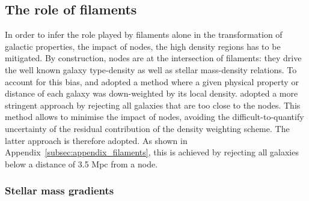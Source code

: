 \documentclass[useAMS,usenatbib]{mnras}
\begin{document}
\subsection{The role of filaments} 
\label{subsec:fil}


In order to infer the role played by filaments alone in the transformation of galactic properties, the impact of nodes, the high density regions has to be mitigated. By construction, nodes are at the intersection of filaments: they drive the well known galaxy type-density as well as stellar mass-density relations. To account for this bias, \citet[][]{Gay2010} and \citet[][]{Malavasi2017} adopted a method where a given physical property or distance of each galaxy was down-weighted by its local density.     
\cite{Laigle2017} adopted a more stringent approach by rejecting all galaxies that are too close to the nodes. This method allows to minimise the impact of nodes, avoiding the difficult-to-quantify uncertainty of the residual contribution of the density weighting scheme. 
The latter approach is therefore adopted.
As shown in Appendix~\ref{subsec:appendix_filaments}, this is achieved by rejecting all galaxies below a distance of 3.5 Mpc from a node.


\subsubsection{Stellar mass gradients}
\label{subsec:grad_skel}
\end{document}
